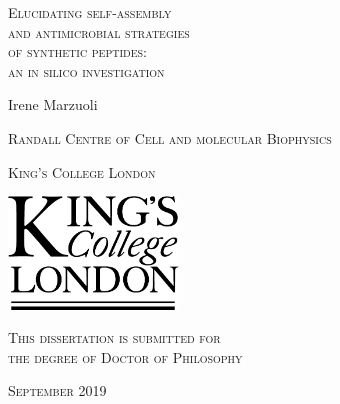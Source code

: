 


\thispagestyle{empty}

\begin{center}


{\textsc {\Huge Elucidating self-assembly}}\\
%
\vspace{.15in}
%
{\textsc {\Huge and antimicrobial strategies}}\\
%
\vspace{.15in}
%
{\textsc {\Huge of synthetic peptides:}}\\
%
\vspace{.15in}
%
{\textsc {\Huge an in silico investigation}}
%
\vspace{1.5in}

{\Large Irene Marzuoli}

\vspace{.4in}

{\textsc {\large Randall Centre of Cell and molecular Biophysics}}

\vspace{0.15in}

{\textsc {\large King's College London}}

\vspace{1in}
\includegraphics[height=3cm]{KCL_logo.pdf}

\vspace{1in}

{\textsc {\large This dissertation is submitted for \\ 
the degree of Doctor of Philosophy}}

\vspace{0.5in}

{\textsc {\large September 2019}}

\end{center}

